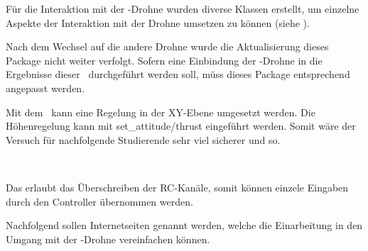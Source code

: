 























Für die Interaktion mit der \COEX-Drohne wurden diverse Klassen erstellt, um einzelne Aspekte der Interaktion mit der Drohne umsetzen zu können (siehe ).

Nach dem Wechsel auf die andere Drohne wurde die Aktualisierung dieses Package nicht weiter verfolgt. Sofern eine Einbindung der \COEX-Drohne in die Ergebnisse dieser \Arbeit\ durchgeführt werden soll, müss dieses Package entsprechend angepasst werden.




Mit dem  \missing\ kann eine Regelung in der XY-Ebene umgesetzt werden. Die Höhenregelung kann mit set\_attitude/thrust eingeführt werden.
Somit wäre der Versuch für nachfolgende Studierende sehr viel sicherer und so.


\missing\


Das  erlaubt das Überschreiben der RC-Kanäle, somit können einzele Eingaben durch den Controller übernommen werden.
\missing\





Nachfolgend sollen Internetseiten genannt werden, welche die Einarbeitung in den Umgang mit der \COEX-Drohne vereinfachen können.

